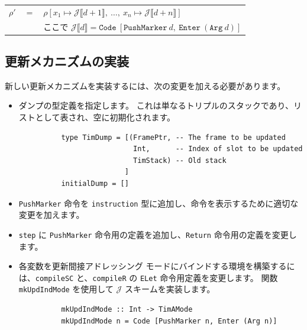\documentclass{jbook}
\begin{document}
\begin{center}
	\begin{tabular}{r c l}
		$\rho'$ & $=$ & $\rho[x_1 \mapsto \mathcal{J} \llbracket d + 1 \rrbracket, ~ \ldots, ~ x_n \mapsto \mathcal{J} \llbracket d + n \rrbracket]$   \\
		        &     & ここで $\mathcal{J}\llbracket d \rrbracket = \texttt{Code} ~ [\texttt{PushMarker} ~ d, ~ \texttt{Enter} ~ (\texttt{Arg} ~ d)]$
	\end{tabular}
\end{center}

\subsection{更新メカニズムの実装}

新しい更新メカニズムを実装するには、次の変更を加える必要があります。

\begin{itemize}
	\item ダンプの型定義を指定します。
	      これは単なるトリプルのスタックであり、リストとして表され、空に初期化されます。
	      \begin{verbatim}
          type TimDump = [(FramePtr, -- The frame to be updated
                           Int,      -- Index of slot to be updated
                           TimStack) -- Old stack
                         ]
          initialDump = []
        \end{verbatim}
	\item \texttt{PushMarker} 命令を \texttt{instruction} 型に追加し、命令を表示するために適切な変更を加えます。
	\item \texttt{step} に \texttt{PushMarker} 命令用の定義を追加し、\texttt{Return} 命令用の定義を変更します。
	\item 各変数を更新間接アドレッシング モードにバインドする環境を構築するには、\texttt{compileSC} と、\texttt{compileR} の \texttt{ELet} 命令用定義を変更します。
	      関数 \texttt{mkUpdIndMode} を使用して $\mathcal{J}$ スキームを実装します。
	      \begin{verbatim}
          mkUpdIndMode :: Int -> TimAMode
          mkUpdIndMode n = Code [PushMarker n, Enter (Arg n)]
        \end{verbatim}
\end{itemize}
\end{document}
